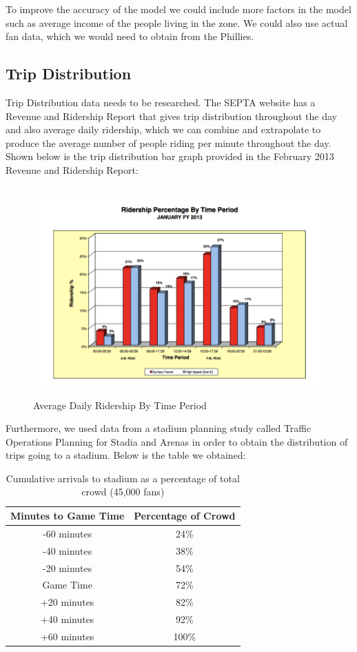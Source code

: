 To improve the accuracy of the model we could include more factors in the model such as
average income of the people living in the zone. We could also use
actual fan data, which we would need to obtain from the Phillies.


\subsection{Trip Distribution}

Trip Distribution data needs to be researched. The SEPTA website has a
Revenue and Ridership Report that gives trip distribution throughout
the day and also average daily ridership, which we can combine and
extrapolate to produce the average number of people riding per minute
throughout the day. Shown below is the trip distribution bar graph
provided in the February 2013 Revenue and Ridership Report:

\begin{figure}[htp]
  \centering
  \includegraphics[height=8cm]{graphics/ridership-per-period.png}
  \caption{Average Daily Ridership By Time Period}
  \label{fig-ridership-per-period}
\end{figure}

Furthermore, we used data from a stadium planning study called Traffic
Operations Planning for Stadia and Arenas in order to obtain the
distribution of trips going to a stadium. Below is the table we
obtained:

\begin{table}
  \centering
  \begin{tabular}{cc}
    Minutes to Game Time & Percentage of Crowd \\
    \hline\hline
    -60 minutes & 24\% \\
    -40 minutes & 38\% \\
    -20 minutes & 54\% \\
     Game Time  & 72\% \\
    +20 minutes & 82\% \\
    +40 minutes & 92\% \\
    +60 minutes & 100\% \\
  \end{tabular}
  \caption{Cumulative arrivals to stadium as a percentage of total crowd (45,000 fans)}
  \label{tab-arrivals}
\end{table}

